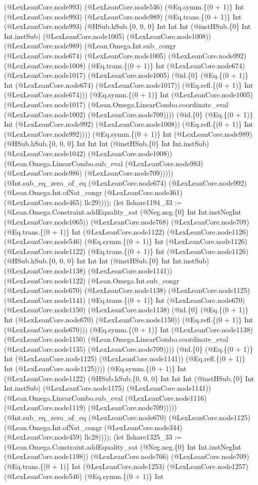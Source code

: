 \documentclass[11pt]{article}
\begin{document}
(@LexLeanCore.node993) (@LexLeanCore.node546) (@Eq.symm.\{(0 + 1)\} Int (@LexLeanCore.node993) (@LexLeanCore.node989) (@Eq.trans.\{(0 + 1)\} Int (@LexLeanCore.node993) (@HSub.hSub.\{0, 0, 0\} Int Int Int (@instHSub.\{0\} Int Int.instSub) (@LexLeanCore.node1005) (@LexLeanCore.node1008)) (@LexLeanCore.node989) (@Lean.Omega.Int.sub\_congr (@LexLeanCore.node674) (@LexLeanCore.node1005) (@LexLeanCore.node992) (@LexLeanCore.node1008) (@Eq.trans.\{(0 + 1)\} Int (@LexLeanCore.node674) (@LexLeanCore.node1017) (@LexLeanCore.node1005) (@id.\{0\} (@Eq.\{(0 + 1)\} Int (@LexLeanCore.node674) (@LexLeanCore.node1017)) (@Eq.refl.\{(0 + 1)\} Int (@LexLeanCore.node674))) (@Eq.symm.\{(0 + 1)\} Int (@LexLeanCore.node1005) (@LexLeanCore.node1017) (@Lean.Omega.LinearCombo.coordinate\_eval (@LexLeanCore.node1002) (@LexLeanCore.node709)))) (@id.\{0\} (@Eq.\{(0 + 1)\} Int (@LexLeanCore.node992) (@LexLeanCore.node1008)) (@Eq.refl.\{(0 + 1)\} Int (@LexLeanCore.node992)))) (@Eq.symm.\{(0 + 1)\} Int (@LexLeanCore.node989) (@HSub.hSub.\{0, 0, 0\} Int Int Int (@instHSub.\{0\} Int Int.instSub) (@LexLeanCore.node1042) (@LexLeanCore.node1008)) (@Lean.Omega.LinearCombo.sub\_eval (@LexLeanCore.node983) (@LexLeanCore.node986) (@LexLeanCore.node709))))) (@Int.sub\_eq\_zero\_of\_eq (@LexLeanCore.node674) (@LexLeanCore.node992) (@Lean.Omega.Int.ofNat\_congr (@LexLeanCore.node361) (@LexLeanCore.node465) llc29)))); (let llshare1194\_33 := (@Lean.Omega.Constraint.addEquality\_sat (@Neg.neg.\{0\} Int Int.instNegInt (@LexLeanCore.node1065)) (@LexLeanCore.node768) (@LexLeanCore.node709) (@Eq.trans.\{(0 + 1)\} Int (@LexLeanCore.node1122) (@LexLeanCore.node1126) (@LexLeanCore.node546) (@Eq.symm.\{(0 + 1)\} Int (@LexLeanCore.node1126) (@LexLeanCore.node1122) (@Eq.trans.\{(0 + 1)\} Int (@LexLeanCore.node1126) (@HSub.hSub.\{0, 0, 0\} Int Int Int (@instHSub.\{0\} Int Int.instSub) (@LexLeanCore.node1138) (@LexLeanCore.node1141)) (@LexLeanCore.node1122) (@Lean.Omega.Int.sub\_congr (@LexLeanCore.node670) (@LexLeanCore.node1138) (@LexLeanCore.node1125) (@LexLeanCore.node1141) (@Eq.trans.\{(0 + 1)\} Int (@LexLeanCore.node670) (@LexLeanCore.node1150) (@LexLeanCore.node1138) (@id.\{0\} (@Eq.\{(0 + 1)\} Int (@LexLeanCore.node670) (@LexLeanCore.node1150)) (@Eq.refl.\{(0 + 1)\} Int (@LexLeanCore.node670))) (@Eq.symm.\{(0 + 1)\} Int (@LexLeanCore.node1138) (@LexLeanCore.node1150) (@Lean.Omega.LinearCombo.coordinate\_eval (@LexLeanCore.node1135) (@LexLeanCore.node709)))) (@id.\{0\} (@Eq.\{(0 + 1)\} Int (@LexLeanCore.node1125) (@LexLeanCore.node1141)) (@Eq.refl.\{(0 + 1)\} Int (@LexLeanCore.node1125)))) (@Eq.symm.\{(0 + 1)\} Int (@LexLeanCore.node1122) (@HSub.hSub.\{0, 0, 0\} Int Int Int (@instHSub.\{0\} Int Int.instSub) (@LexLeanCore.node1175) (@LexLeanCore.node1141)) (@Lean.Omega.LinearCombo.sub\_eval (@LexLeanCore.node1116) (@LexLeanCore.node1119) (@LexLeanCore.node709))))) (@Int.sub\_eq\_zero\_of\_eq (@LexLeanCore.node670) (@LexLeanCore.node1125) (@Lean.Omega.Int.ofNat\_congr (@LexLeanCore.node344) (@LexLeanCore.node459) llc28)))); (let llshare1325\_33 := (@Lean.Omega.Constraint.addEquality\_sat (@Neg.neg.\{0\} Int Int.instNegInt (@LexLeanCore.node1198)) (@LexLeanCore.node766) (@LexLeanCore.node709) (@Eq.trans.\{(0 + 1)\} Int (@LexLeanCore.node1253) (@LexLeanCore.node1257) (@LexLeanCore.node546) (@Eq.symm.\{(0 + 1)\} Int 
\end{document}
